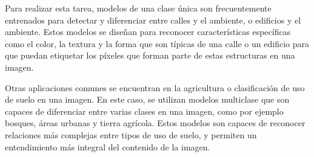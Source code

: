 Para realizar esta tarea, modelos de una clase única son frecuentemente entrenados para detectar y diferenciar entre
calles y el ambiente, o edificios y el ambiente. Estos modelos se diseñan para reconocer características específicas
como el color, la textura y la forma que son típicas de una calle o un edificio para que puedan etiquetar los píxeles
que forman parte de estas estructuras en una imagen. \autocite{cole-segmentation}

Otras aplicaciones comunes se encuentran en la agricultura o clasificación de uso de suelo en una imagen. En este caso,
se utilizan modelos multiclase que son capaces de diferenciar entre varias clases en una imagen, como por ejemplo
bosques, áreas urbanas y tierra agrícola. Estos modelos son capaces de reconocer relaciones más complejas entre tipos
de uso de suelo, y permiten un entendimiento más integral del contenido de la imagen. \autocite{cole-segmentation}
